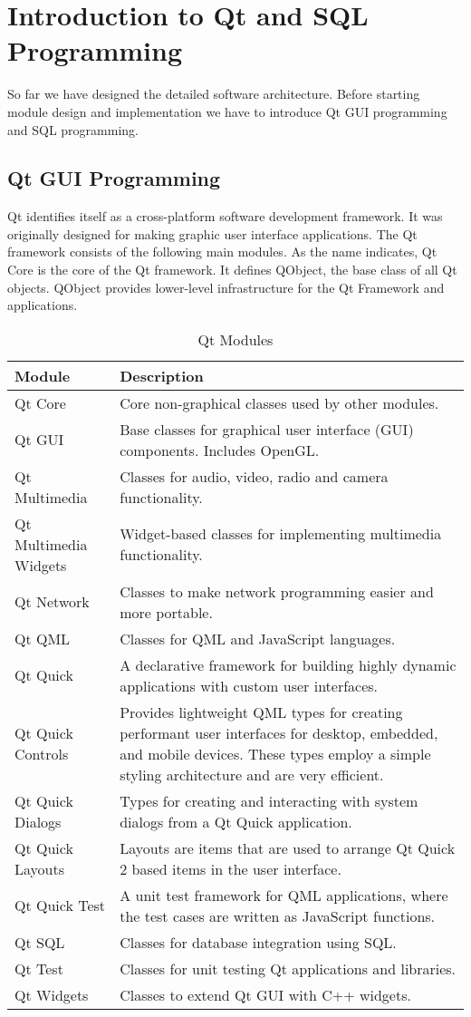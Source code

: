 \chapter{Introduction to Qt and SQL Programming}
So far we have designed the detailed software architecture. Before starting module design and implementation we have to introduce Qt GUI programming and SQL programming.

\section{Qt GUI Programming}
Qt identifies itself as a cross-platform software development framework. It was originally designed for making graphic user interface applications. The Qt framework consists of the following main modules. As the name indicates, Qt Core is the core of the Qt framework. It defines QObject, the base class of all Qt objects. QObject provides lower-level infrastructure for the Qt Framework and applications.

\begin{table}[htbp]
\centering
\caption {Qt Modules} \label{tab:Qt Modules}
\begin{tabular}{ll}
\hline
Module & Description \\
\hline
Qt Core & Core non-graphical classes used by other modules. \\ 
Qt GUI & Base classes for graphical user interface (GUI) components. Includes OpenGL. \\
Qt Multimedia & Classes for audio, video, radio and camera functionality. \\
Qt Multimedia Widgets & Widget-based classes for implementing multimedia functionality. \\
Qt Network & Classes to make network programming easier and more portable. \\
Qt QML & Classes for QML and JavaScript languages. \\
Qt Quick & A declarative framework for building highly dynamic applications with custom user interfaces. \\
Qt Quick Controls & Provides lightweight QML types for creating performant user interfaces for desktop, embedded, and mobile devices. These types employ a simple styling architecture and are very efficient. \\
Qt Quick Dialogs & Types for creating and interacting with system dialogs from a Qt Quick application. \\
Qt Quick Layouts & Layouts are items that are used to arrange Qt Quick 2 based items in the user interface. \\
Qt Quick Test & A unit test framework for QML applications, where the test cases are written as JavaScript functions. \\
Qt SQL & Classes for database integration using SQL. \\
Qt Test & Classes for unit testing Qt applications and libraries. \\
Qt Widgets & Classes to extend Qt GUI with C++ widgets. \\
\hline
\end{tabular}
\end{table}

